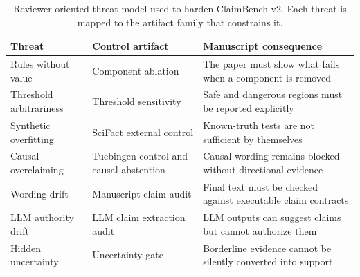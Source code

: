 \begin{table}[t]
\centering
\caption{Reviewer-oriented threat model used to harden ClaimBench v2. Each threat is mapped to the artifact family that constrains it.}
\label{tab:threat-model}
\small
\begin{tabularx}{\textwidth}{p{}p{}X}
\toprule
Threat & Control artifact & Manuscript consequence \\
\midrule
Rules without value & Component ablation & The paper must show what fails when a component is removed \\
Threshold arbitrariness & Threshold sensitivity & Safe and dangerous regions must be reported explicitly \\
Synthetic overfitting & SciFact external control & Known-truth tests are not sufficient by themselves \\
Causal overclaiming & Tuebingen control and causal abstention & Causal wording remains blocked without directional evidence \\
Wording drift & Manuscript claim audit & Final text must be checked against executable claim contracts \\
LLM authority drift & LLM claim extraction audit & LLM outputs can suggest claims but cannot authorize them \\
Hidden uncertainty & Uncertainty gate & Borderline evidence cannot be silently converted into support \\
\bottomrule
\end{tabularx}
\end{table}


